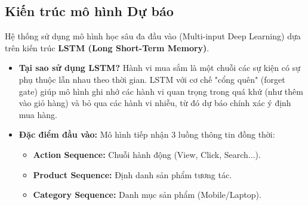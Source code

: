 \documentclass[12pt,a4paper]{report}
\begin{document}
\subsection{Kiến trúc mô hình Dự báo}
Hệ thống sử dụng mô hình học sâu đa đầu vào (Multi-input Deep Learning) dựa trên kiến trúc \textbf{LSTM (Long Short-Term Memory)}.
\begin{itemize}
    \item \textbf{Tại sao sử dụng LSTM?} Hành vi mua sắm là một chuỗi các sự kiện có sự phụ thuộc lẫn nhau theo thời gian. LSTM với cơ chế "cổng quên" (forget gate) giúp mô hình ghi nhớ các hành vi quan trọng trong quá khứ (như thêm vào giỏ hàng) và bỏ qua các hành vi nhiễu, từ đó dự báo chính xác ý định mua hàng.
    \item \textbf{Đặc điểm đầu vào:} Mô hình tiếp nhận 3 luồng thông tin đồng thời:
        \begin{itemize}
            \item \textbf{Action Sequence:} Chuỗi hành động (View, Click, Search...).
            \item \textbf{Product Sequence:} Định danh sản phẩm tương tác.
            \item \textbf{Category Sequence:} Danh mục sản phẩm (Mobile/Laptop).
        \end{itemize}
\end{itemize}
\end{document}
